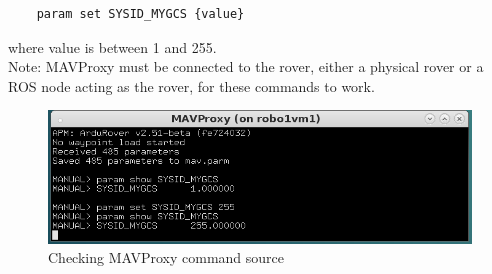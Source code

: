 \documentclass{report}
\begin{document}
\begin{lstlisting}
	param set SYSID_MYGCS {value}
\end{lstlisting}

where value is between 1 and 255.\\

Note: MAVProxy must be connected to the rover, either a physical rover or a ROS node acting as the rover, for these commands to work.

\begin{figure}[ht]
	\centering
	\includegraphics{Images/MAVcommandSourse}
	\caption{Checking MAVProxy command source}
\end{figure}
\end{document}
